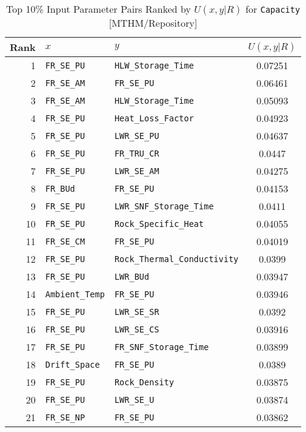 \begin{center}
\begin{table}[htbp]
\caption{Top 10\% Input Parameter Pairs Ranked by $U(x,y|R)$ for \texttt{Capacity} [MTHM/Repository]}
\label{U_xy_R_for_Capacity_with_IJK7}
\begin{center}
\begin{tabular}{|r|l|l|c|}
\hline
Rank&\textbf{$x$}&\textbf{$y$}&\textbf{$U(x,y|R)$}\\
\hline
1&\texttt{FR\_SE\_PU}&\texttt{HLW\_Storage\_Time}&0.07251\\
\hline
2&\texttt{FR\_SE\_AM}&\texttt{FR\_SE\_PU}&0.06461\\
\hline
3&\texttt{FR\_SE\_AM}&\texttt{HLW\_Storage\_Time}&0.05093\\
\hline
4&\texttt{FR\_SE\_PU}&\texttt{Heat\_Loss\_Factor}&0.04923\\
\hline
5&\texttt{FR\_SE\_PU}&\texttt{LWR\_SE\_PU}&0.04637\\
\hline
6&\texttt{FR\_SE\_PU}&\texttt{FR\_TRU\_CR}&0.0447\\
\hline
7&\texttt{FR\_SE\_PU}&\texttt{LWR\_SE\_AM}&0.04275\\
\hline
8&\texttt{FR\_BUd}&\texttt{FR\_SE\_PU}&0.04153\\
\hline
9&\texttt{FR\_SE\_PU}&\texttt{LWR\_SNF\_Storage\_Time}&0.0411\\
\hline
10&\texttt{FR\_SE\_PU}&\texttt{Rock\_Specific\_Heat}&0.04055\\
\hline
11&\texttt{FR\_SE\_CM}&\texttt{FR\_SE\_PU}&0.04019\\
\hline
12&\texttt{FR\_SE\_PU}&\texttt{Rock\_Thermal\_Conductivity}&0.0399\\
\hline
13&\texttt{FR\_SE\_PU}&\texttt{LWR\_BUd}&0.03947\\
\hline
14&\texttt{Ambient\_Temp}&\texttt{FR\_SE\_PU}&0.03946\\
\hline
15&\texttt{FR\_SE\_PU}&\texttt{LWR\_SE\_SR}&0.0392\\
\hline
16&\texttt{FR\_SE\_PU}&\texttt{LWR\_SE\_CS}&0.03916\\
\hline
17&\texttt{FR\_SE\_PU}&\texttt{FR\_SNF\_Storage\_Time}&0.03899\\
\hline
18&\texttt{Drift\_Space}&\texttt{FR\_SE\_PU}&0.0389\\
\hline
19&\texttt{FR\_SE\_PU}&\texttt{Rock\_Density}&0.03875\\
\hline
20&\texttt{FR\_SE\_PU}&\texttt{LWR\_SE\_U}&0.03874\\
\hline
21&\texttt{FR\_SE\_NP}&\texttt{FR\_SE\_PU}&0.03862\\

\end{tabular}
\end{center}
\end{table}
\end{center}
